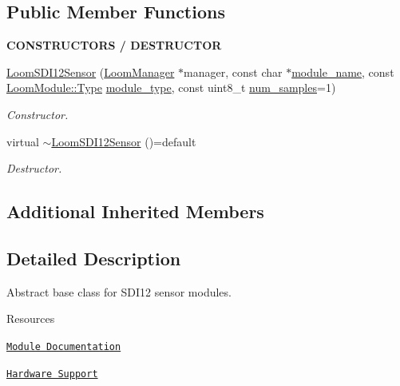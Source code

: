 \subsection*{Public Member Functions}
\begin{Indent}{\bf C\+O\+N\+S\+T\+R\+U\+C\+T\+O\+RS / D\+E\+S\+T\+R\+U\+C\+T\+OR}\par
\begin{DoxyCompactItemize}
\item 
\hyperlink{class_loom_s_d_i12_sensor_a63046778156b466c978abd5a4553d856}{Loom\+S\+D\+I12\+Sensor} (\hyperlink{class_loom_manager}{Loom\+Manager} $\ast$manager, const char $\ast$\hyperlink{class_loom_module_adf6e68ad7e9fa2acfca7a8a280680764}{module\+\_\+name}, const \hyperlink{class_loom_module_aee91d0a75140d51ee428fc2d4417d865}{Loom\+Module\+::\+Type} \hyperlink{class_loom_module_a152d394f37236a2b159dae19da67eeb0}{module\+\_\+type}, const uint8\+\_\+t \hyperlink{class_loom_sensor_a0e74ebbaecde15ed1c71e1bb6bc6aebe}{num\+\_\+samples}=1)
\begin{DoxyCompactList}\small\item\em Constructor. \end{DoxyCompactList}\item 
virtual \hyperlink{class_loom_s_d_i12_sensor_a58c4dff03ae7cc178bcf322ba4fdd393}{$\sim$\+Loom\+S\+D\+I12\+Sensor} ()=default
\begin{DoxyCompactList}\small\item\em Destructor. \end{DoxyCompactList}\end{DoxyCompactItemize}
\end{Indent}
\subsection*{Additional Inherited Members}


\subsection{Detailed Description}
Abstract base class for S\+D\+I12 sensor modules. 

\begin{DoxyParagraph}{Resources}

\begin{DoxyItemize}
\item \href{https://openslab-osu.github.io/Loom/html/class_loom_s_d_i12_sensor.html}{\tt Module Documentation}
\item \href{https://github.com/OPEnSLab-OSU/Loom/wiki/Hardware-Support#sdi-12-sensors}{\tt Hardware Support} 
\end{DoxyItemize}
\end{DoxyParagraph}


